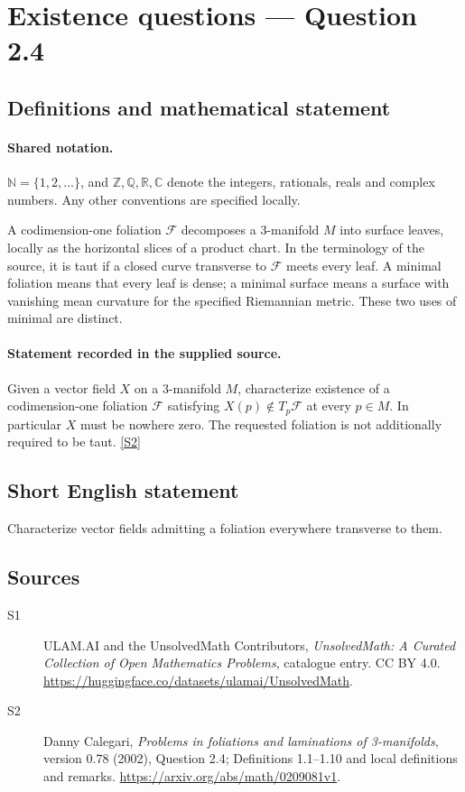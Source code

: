 \documentclass[11pt]{article}
\newcommand{\sref}[2]{\hyperlink{source:#1:#2}{[S#2]}}
\begin{document}
\section{Existence questions — Question 2.4}\label{statement}

\subsection{Definitions and mathematical statement}

\paragraph{Shared notation.}$\mathbb N=\{1,2,\ldots\}$, and $\mathbb Z,\mathbb Q,\mathbb R,\mathbb C$ denote the integers, rationals, reals and complex numbers. Any other conventions are specified locally.


A codimension-one foliation $\mathcal F$ decomposes a $3$-manifold $M$ into surface leaves, locally as the horizontal slices of a product chart. In the terminology of the source, it is taut if a closed curve transverse to $\mathcal F$ meets every leaf. A minimal foliation means that every leaf is dense; a minimal surface means a surface with vanishing mean curvature for the specified Riemannian metric. These two uses of minimal are distinct.
\paragraph{Statement recorded in the supplied source.}
Given a vector field $X$ on a $3$-manifold $M$, characterize existence of a codimension-one foliation $\mathcal F$ satisfying $X(p)\notin T_p\mathcal F$ at every $p\in M$. In particular $X$ must be nowhere zero. The requested foliation is not additionally required to be taut. \sref{statement}{2}
\subsection{Short English statement}
Characterize vector fields admitting a foliation everywhere transverse to them.
\subsection{Sources}
\begin{description}
\item[\hypertarget{source:statement:1}{S1}] ULAM.AI and the UnsolvedMath Contributors, \emph{UnsolvedMath: A Curated Collection of Open Mathematics Problems}, catalogue entry. CC BY 4.0. \url{https://huggingface.co/datasets/ulamai/UnsolvedMath}.
\item[\hypertarget{source:statement:2}{S2}] Danny Calegari, \emph{Problems in foliations and laminations of 3-manifolds}, version 0.78 (2002), Question 2.4; Definitions 1.1--1.10 and local definitions and remarks. \url{https://arxiv.org/abs/math/0209081v1}.
\end{description}
\label{end:statement}
\end{document}

